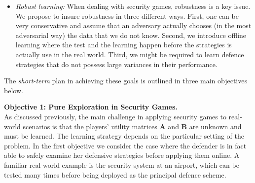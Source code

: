 \begin{itemize}
\item \textit{Robust learning:} When dealing with security games, robustness is a key issue. We propose to insure robustness in  three different ways. First, one can be  very conservative and assume that an adversary actually chooses (in the most adversarial way) the data that we do not know. Second, we introduce offline learning  where the test and the learning happen  before the strategies is actually use in the real world. Third, we might be required to learn defence strategies that do not possess large variances in their performance. 
\end{itemize}
The \textit{short-term} plan in achieving these goals is outlined in three main objectives below.

\textbf{Objective 1: Pure Exploration in Security Games.}\\
As discussed previously, the main challenge in applying security games to real-world scenarios is that the players' utility matrices $\boldsymbol A$ and $\boldsymbol B$ are unknown and must be learned. The learning strategy depends on the particular setting of the problem. In the first objective we consider the case where the defender is in fact able to safely examine her defensive strategies before applying them online. A familiar real-world example is the security system at an airport, which can be tested many times before being deployed as the principal defence scheme.

